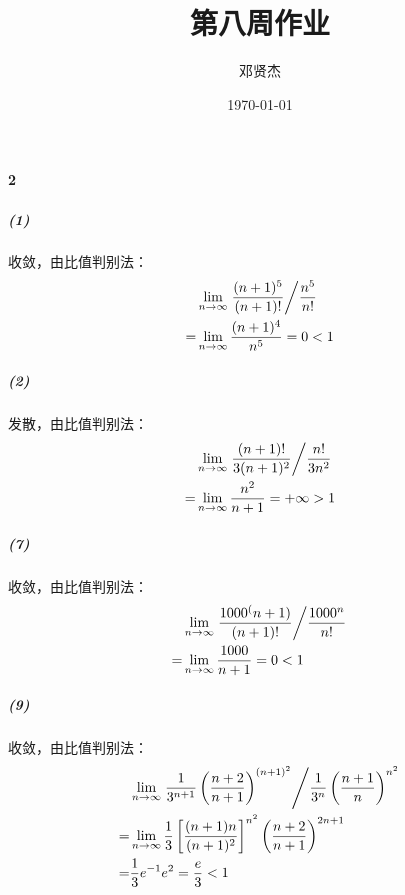 \documentclass[UTF8]{ctexart}
\title{第八周作业}
\author{邓贤杰}
\date{\today}
\begin{document}
    \maketitle
    \paragraph*{2}
    \subparagraph*{(1)}
    收敛，由比值判别法：
    \begin{align*}
        &\lim \limits_{n \to \infty} \left. \frac{(n+1)^5}{(n+1)!} \middle/ \frac{n^5}{n!} \right. \\
        =& \lim \limits_{n \to \infty} \frac{(n+1)^4}{n^5} =0 < 1
    \end{align*}
    
    \subparagraph*{(2)}
    发散，由比值判别法：
    \begin{align*}
        &\lim \limits_{n \to \infty} \left. \frac{(n+1)!}{3(n+1)^2} \middle/ \frac{n!}{3n^2} \right. \\
        =& \lim \limits_{n \to \infty} \frac{n^2}{n+1} = +\infty > 1
    \end{align*}

    \subparagraph*{(7)}
    收敛，由比值判别法：
    \begin{align*}
        &\lim \limits_{n \to \infty} \left. \frac{1000^(n+1)}{(n+1)!} \middle/ \frac{1000^n}{n!} \right. \\
        =& \lim \limits_{n \to \infty} \frac{1000}{n+1} = 0 < 1
    \end{align*}

    \subparagraph*{(9)}
    收敛，由比值判别法：
    \begin{align*}
        &\lim \limits_{n \to \infty} \left. \frac{1}{3^{n+1}} \left(\frac{n+2}{n+1}\right)^{(n+1)^2} \middle/
         \frac{1}{3^n} \left(\frac{n+1}{n}\right)^{n^2} \right. \\
        =& \lim \limits_{n \to \infty} \frac{1}{3} 
        \left[\frac{(n+1)n}{(n+1)^2} \right]^{n^2} \left(\frac{n+2}{n+1} \right)^{2n+1} \\
        =& \frac{1}{3} e^{-1} e^2 = \frac{e}{3} < 1
    \end{align*}
\end{document}
